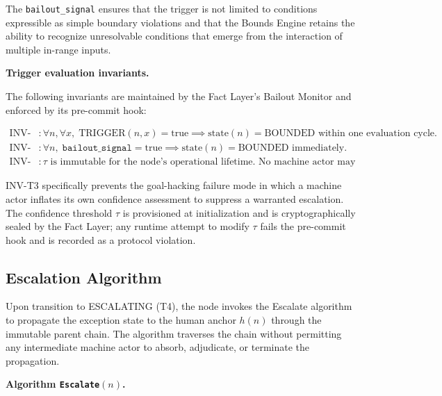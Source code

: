 The \texttt{bailout\_signal} ensures that the trigger is not limited to conditions expressible as simple boundary violations and that the Bounds Engine retains the ability to recognize unresolvable conditions that emerge from the interaction of multiple in-range inputs.

\bigskip
\noindent\textbf{Trigger evaluation invariants.}

The following invariants are maintained by the Fact Layer's Bailout Monitor and enforced by its pre-commit hook:

\begin{align}
\text{INV-T1} &: \forall n, \forall x,\; \text{TRIGGER}(n, x) = \text{true} \implies \text{state}(n) = \text{BOUNDED} \text{ within one evaluation cycle.} \tag{INV-T1} \\
\text{INV-T2} &: \forall n,\; \texttt{bailout\_signal} = \text{true} \implies \text{state}(n) = \text{BOUNDED} \text{ immediately.} \tag{INV-T2} \\
\text{INV-T3} &: \tau \text{ is immutable for the node's operational lifetime. No machine actor may adjust it at runtime.} \tag{INV-T3}
\end{align}

INV-T3 specifically prevents the goal-hacking failure mode in which a machine actor inflates its own confidence assessment to suppress a warranted escalation. The confidence threshold $\tau$ is provisioned at initialization and is cryptographically sealed by the Fact Layer; any runtime attempt to modify $\tau$ fails the pre-commit hook and is recorded as a protocol violation.

\subsection{Escalation Algorithm}\label{sec:escalation-algorithm}

Upon transition to ESCALATING (T4), the node invokes the Escalate algorithm to propagate the exception state to the human anchor $h(n)$ through the immutable parent chain. The algorithm traverses the chain without permitting any intermediate machine actor to absorb, adjudicate, or terminate the propagation.

\bigskip
\noindent\textbf{Algorithm \texttt{Escalate}$(n)$.}

